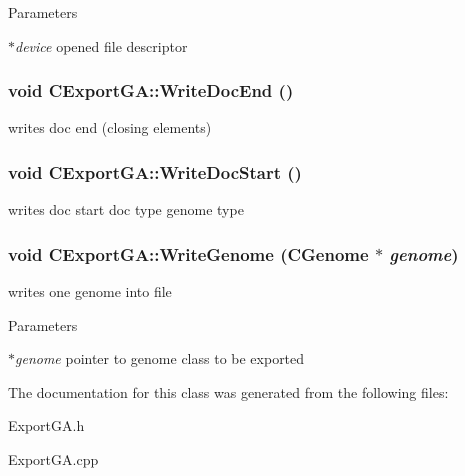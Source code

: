 \begin{DoxyParams}{Parameters}
\item[{\em $\ast$device}]opened file descriptor \end{DoxyParams}
\hypertarget{classCExportGA_ad0fa22bd7fb670f980220e908009a9aa}{
\subsubsection[{WriteDocEnd}]{\setlength{\rightskip}{0pt plus 5cm}void CExportGA::WriteDocEnd ()}}
\label{classCExportGA_ad0fa22bd7fb670f980220e908009a9aa}
writes doc end (closing elements) \hypertarget{classCExportGA_acea05138092ae64ba357a4912a0bf439}{
\subsubsection[{WriteDocStart}]{\setlength{\rightskip}{0pt plus 5cm}void CExportGA::WriteDocStart ()}}
\label{classCExportGA_acea05138092ae64ba357a4912a0bf439}
writes doc start doc type genome type \hypertarget{classCExportGA_a422e44e86f39b68cb9e3eaf72229068b}{
\subsubsection[{WriteGenome}]{\setlength{\rightskip}{0pt plus 5cm}void CExportGA::WriteGenome ({\bf CGenome} $\ast$ {\em genome})}}
\label{classCExportGA_a422e44e86f39b68cb9e3eaf72229068b}
writes one genome into file


\begin{DoxyParams}{Parameters}
\item[{\em $\ast$genome}]pointer to genome class to be exported \end{DoxyParams}


The documentation for this class was generated from the following files:\begin{DoxyCompactItemize}
\item 
ExportGA.h\item 
ExportGA.cpp\end{DoxyCompactItemize}
